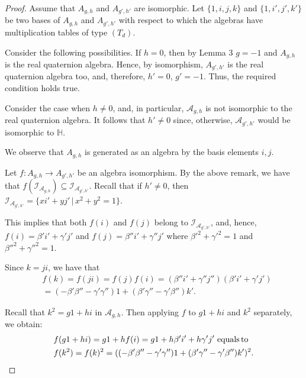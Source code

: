 \documentclass{amsart}
\theoremstyle{definition}
\theoremstyle{plain}
\begin{document}
\begin{proof}
Assume that  $A_{g, h}$ and $A_{g', h'}$ are isomorphic. Let $\{1, i, j, k\}$ and $\{1, i', j', k'\}$ be two bases of $A_{g, h}$ and $A_{g', h'}$ with respect to which the algebras 
have multiplication tables of type $(T_d)$. 

 Consider the following possibilities. If $h=0$, then by Lemma 3 $g=-1$ and $A_{g, h}$ is the real quaternion algebra. Hence, by isomorphism,
$A_{g', h'}$ is the real quaternion algebra too, and, therefore, $h'=0$, $g'=-1$. Thus, the required condition holds true. 

Consider the case when $h\neq 0$, and, in particular, $\mathcal A_{g, h}$ is not isomorphic to the real quaternion algebra. It follows that $h'\neq 0$ since, otherwise, ${\mathcal A}_{g', h'}$ would be isomorphic to $\mathbb H$.

We observe that $A_{g,h}$ is generated as an algebra by the basis elements $i, j$.

Let $f: A_{g, h}\to A_{g', h'}$ be an algebra isomorphism.  By the above remark, we have that $f({\mathcal I}_{{\mathcal A}_{g, h}}) \subseteq {\mathcal I}_{{\mathcal A}_{g', h'}}$. 
Recall that if $h'\neq 0$, then $ \mathcal I_{{\mathcal A}_{g', h'}} = \{  x i' + y j' \,|\, x^2 + y^2 = 1\}.$ 

This implies that  both $f(i)$ and $f(j)$ belong to $ \mathcal I_{{\mathcal A}_{g', h'}}$, and, hence, 
$f(i) = \beta' i' + \gamma' j'$ and $f(j) = \beta'' i' + \gamma'' j'$ where $\beta'^2 +\gamma'^2 = 1$ and $\beta''^2 +\gamma''^2 = 1$.  

Since $k=ji$, we have that 
\begin{align*}
&f(k) = f(ji) = f(j) f(i) = (\beta'' i' + \gamma'' j'') (\beta' i' + \gamma' j')\\
&= (-\beta'\beta'' - \gamma'\gamma'' )1 + (\beta'\gamma'' - \gamma'\beta'') k'.
\end{align*}

Recall that $k^2 = g1+hi$ in $\mathcal A_{g, h}$. Then applying $f$ to $g1 + hi$ and $k^2$ separately, we obtain: 
\begin{align*}
& f(g1+hi)= g 1 + h f(i) = g1 + h \beta' i' + h \gamma' j' \,\, \text{equals\,to}  \\
& f(k^2)= f(k)^2 =  ( (-\beta' \beta'' - \gamma'\gamma'') 1 + (\beta' \gamma'' - \gamma' \beta'') k' )^2.
\end{align*}


\end{proof}
\end{document}
